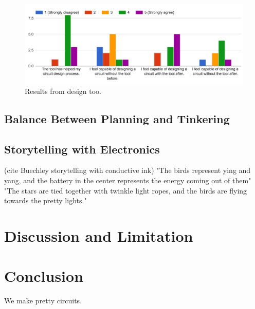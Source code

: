 \documentclass{sigchi}
\begin{document}
\begin{figure}[h]
\centering
\includegraphics[width=1.0\columnwidth]{figures/design_tool_results.png}
\caption{Results from design too. }
\label{fig:design_tool_results}
\end{figure}

\subsection{Balance Between Planning and Tinkering}
\subsection{Storytelling with Electronics}
(cite Buechley storytelling with conductive ink)
"The birds represent ying and yang, and the battery in the center represents the energy coming out of them"
"The stars are tied together with twinkle light ropes, and the birds are flying towards the pretty lights."

\section {Discussion and Limitation}

\section {Conclusion}
We make pretty circuits. 


\balance



\end{document}
